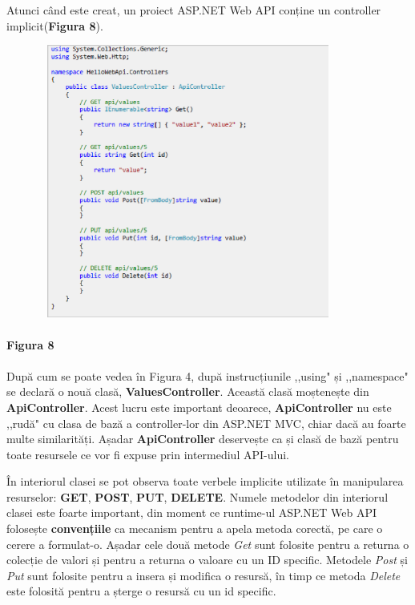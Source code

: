 Atunci când este creat, un proiect ASP.NET Web API conține un controller implicit(\textbf{Figura 8}).

\begin{center}
\includegraphics[width=12cm,height=9cm,keepaspectratio]{imagini/ControllerAPI.eps} 
\paragraph{}
\textbf{Figura 8}
\end{center}

\paragraph{} După cum se poate vedea în Figura 4, după instrucțiunile ,,using" și ,,namespace" se declară o nouă clasă, \textbf{ValuesController}. Această clasă moștenește din \textbf{ApiController}. Acest lucru este important deoarece, \textbf{ApiController} nu este ,,rudă" cu clasa de bază a controller-lor din ASP.NET MVC, chiar dacă au foarte multe similarități. Așadar \textbf{ApiController} deservește ca și clasă de bază pentru toate resursele ce vor fi expuse prin intermediul API-ului.

În interiorul clasei se pot observa toate verbele implicite utilizate în manipularea resurselor: \textbf{GET}, \textbf{POST}, \textbf{PUT}, \textbf{DELETE}. Numele metodelor din interiorul clasei este foarte important, din moment ce runtime-ul ASP.NET Web API folosește \textbf{convențiile} ca mecanism pentru a apela metoda corectă, pe care o cerere a formulat-o. Așadar cele două metode \textit{Get} sunt folosite pentru a returna o colecție de valori și pentru a returna o valoare cu un ID specific. Metodele \textit{Post} și \textit{Put} sunt folosite pentru a insera și modifica o resursă, în timp ce metoda \textit{Delete} este folosită pentru a șterge o resursă cu un id specific.

